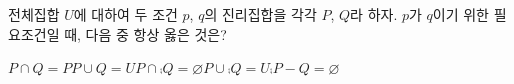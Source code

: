 전체집합 $U$에 대하여 두 조건 $p$, $q$의 진리집합을 각각 $P$, $Q$라 하자. $p$가 $q$이기 위한 필요조건일 때, 다음 중 항상 옳은 것은?
\begin{choices32}{$P\cap Q=P$}{$P\cup Q=U$}{$P\cap\comp{Q}=\varnothing$}{$P\cup\comp{Q}=U$}{$\comp{P}-Q=\varnothing$}\end{choices32}

